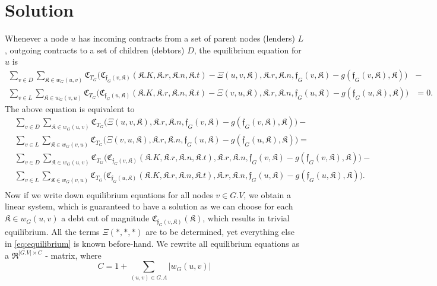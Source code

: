 \documentclass[10pt]{article}
\newcommand{\RR}{\mathfrak{R}}
\newcommand{\KK}{\mathfrak{K}}
\newcommand{\CC}{\mathfrak{C}}
\newcommand{\ff}{\mathfrak{f}}
\begin{document}
\section{Solution}
Whenever a node $u$ has incoming contracts from a set of parent nodes (lenders) $L$, outgoing contracts to a set of children (debtors) $D$, the equilibrium equation for $u$ is
\begin{equation*}
\begin{aligned}
\sum_{v \in D} \sum_{\KK \in w_G(u, v)} \CC_{T_G} \big( \CC_{\ff_G(v, \KK)} ( \KK.K, \KK.r, \KK.n, \KK.t ) - \Xi(u, v, \KK), \KK.r, \KK.n,  \ff_G(v, \KK)  -  g(\ff_G(v, \KK), \KK) \big) & - \\ 
\sum_{v \in L} \sum_{\KK \in w_G(v, u)} \CC_{T_G} \big( \CC_{\ff_G(u, \KK)} ( \KK.K, \KK.r, \KK.n, \KK.t ) - \Xi(v, u, \KK), \KK.r, \KK.n,   \ff_G(u, \KK) -  g(\ff_G(u, \KK), \KK) \big) & = 0.
\end{aligned}
\end{equation*}
The above equation is equivalent to
\begin{equation}
\label{eq:equilibrium}
\begin{aligned}
& \sum_{v \in D} \sum_{\KK \in w_G(u, v)} \CC_{T_G} \big( \Xi(u, v, \KK), \KK.r, \KK.n, \ff_G(v, \KK) - g( \ff_G(v, \KK), \KK )  \big) - \\
& \sum_{v \in L} \sum_{\KK \in w_G(v, u)} \CC_{T_G} \big( \Xi(v, u, \KK), \KK.r, \KK.n, \ff_G(u, \KK)  -  g( \ff_G(u, \KK), \KK ) \big) = \\
& \sum_{ v \in D } \sum_{ \KK \in w_G(u, v) } \CC_{T_G} \big( \CC_{ \ff_G(v, \KK) } (\KK.K, \KK.r, \KK.n, \KK.t), \KK.r, \KK.n, \ff_G( v, \KK ) - g( \ff_G(v, \KK), \KK ) \big) - \\
& \sum_{ v \in L } \sum_{ \KK \in w_G(v, u) } \CC_{T_G} \big( \CC_{ \ff_G(u, \KK) } (\KK.K, \KK.r, \KK.n, \KK.t), \KK.r, \KK.n, \ff_G( u , \KK) - g( \ff_G(u, \KK), \KK ) \big). \\
\end{aligned}
\end{equation}
Now if we write down equilibrium equations for all nodes $v \in G.V$, we obtain a linear system, which is guaranteed to have a solution as we can choose for each $\KK \in w_G(u, v)$ a debt cut of magnitude $\CC_{\ff_G(v, \KK)}(\KK)$, which results in trivial equilibrium. All the terms $\Xi(*, *, *)$ are to be determined, yet everything else in \eqref{eq:equilibrium} is known before-hand. We rewrite all equilibrium equations as a $\RR^{|G.V| \times C}$ - matrix, where 
\[
C = 1 + \sum_{(u, v) \in G.A} |w_G(u, v)|
\]
\end{document}
